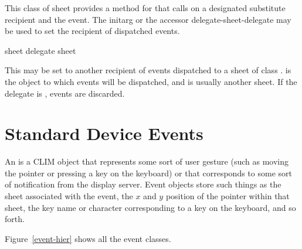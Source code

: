 
This class of sheet provides a method for  that calls
 on a designated substitute recipient and the event.  The
initarg  or the accessor {delegate-sheet-delegate} may be used to
set the recipient of dispatched events.

 {sheet}
 {delegate sheet}

This may be set to another recipient of events dispatched to a sheet of class
.   is the object to which events
will be dispatched, and is usually another sheet.  If the delegate is ,
events are discarded.




\section {Standard Device Events}

An  is a CLIM object that represents some sort of user gesture
(such as moving the pointer or pressing a key on the keyboard) or that
corresponds to some sort of notification from the display server.  Event objects
store such things as the sheet associated with the event, the $x$ and $y$
position of the pointer within that sheet, the key name or character
corresponding to a key on the keyboard, and so forth.

Figure~\ref{event-hier} shows all the event classes.

